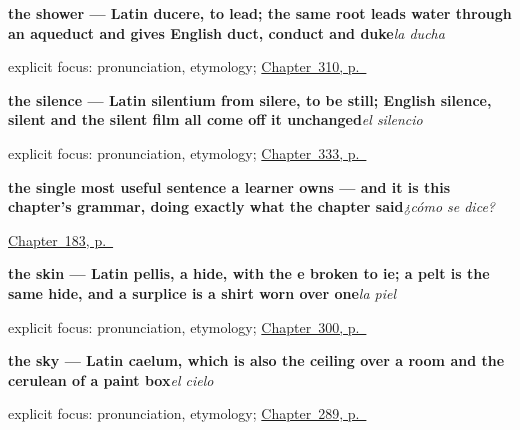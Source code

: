 \noindent\begin{minipage}[t]{\linewidth}
\raggedright
\textbf{the shower — Latin ducere, to lead; the same root leads water through an aqueduct and gives English duct, conduct and duke}\enspace\emph{la ducha}\par
\footnotesize explicit focus: pronunciation, etymology; \hyperref[ch:el-cuarto-y-la-mesa]{Chapter~310, p.~\pageref*{ch:el-cuarto-y-la-mesa}}
\end{minipage}\par\smallskip

\noindent\begin{minipage}[t]{\linewidth}
\raggedright
\textbf{the silence — Latin silentium from silere, to be still; English silence, silent and the silent film all come off it unchanged}\enspace\emph{el silencio}\par
\footnotesize explicit focus: pronunciation, etymology; \hyperref[ch:calma-y-prisa]{Chapter~333, p.~\pageref*{ch:calma-y-prisa}}
\end{minipage}\par\smallskip

\noindent\begin{minipage}[t]{\linewidth}
\raggedright
\textbf{the single most useful sentence a learner owns — and it is this chapter's grammar, doing exactly what the chapter said}\enspace\emph{¿cómo se dice?}\par
\footnotesize \hyperref[ch:como-se-dice]{Chapter~183, p.~\pageref*{ch:como-se-dice}}
\end{minipage}\par\smallskip

\noindent\begin{minipage}[t]{\linewidth}
\raggedright
\textbf{the skin — Latin pellis, a hide, with the e broken to ie; a pelt is the same hide, and a surplice is a shirt worn over one}\enspace\emph{la piel}\par
\footnotesize explicit focus: pronunciation, etymology; \hyperref[ch:el-cuerpo-dice]{Chapter~300, p.~\pageref*{ch:el-cuerpo-dice}}
\end{minipage}\par\smallskip

\noindent\begin{minipage}[t]{\linewidth}
\raggedright
\textbf{the sky — Latin caelum, which is also the ceiling over a room and the cerulean of a paint box}\enspace\emph{el cielo}\par
\footnotesize explicit focus: pronunciation, etymology; \hyperref[ch:lo-de-arriba]{Chapter~289, p.~\pageref*{ch:lo-de-arriba}}
\end{minipage}\par\smallskip

